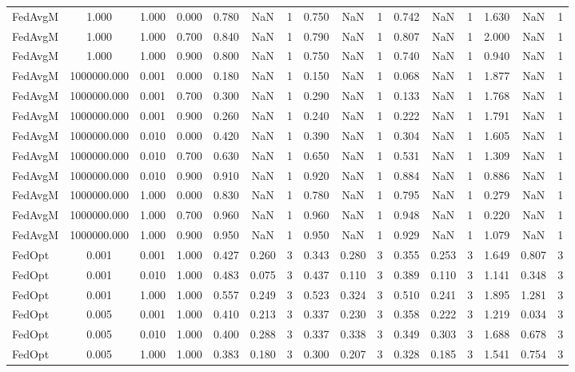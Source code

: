 \begin{table}[htbp]
\begin{tabular}{lccccccccccccccc}
FedAvgM & 1.000 & 1.000 & 0.000 & 0.780 & NaN & 1 & 0.750 & NaN & 1 & 0.742 & NaN & 1 & 1.630 & NaN & 1 \\
FedAvgM & 1.000 & 1.000 & 0.700 & 0.840 & NaN & 1 & 0.790 & NaN & 1 & 0.807 & NaN & 1 & 2.000 & NaN & 1 \\
FedAvgM & 1.000 & 1.000 & 0.900 & 0.800 & NaN & 1 & 0.750 & NaN & 1 & 0.740 & NaN & 1 & 0.940 & NaN & 1 \\
FedAvgM & 1000000.000 & 0.001 & 0.000 & 0.180 & NaN & 1 & 0.150 & NaN & 1 & 0.068 & NaN & 1 & 1.877 & NaN & 1 \\
FedAvgM & 1000000.000 & 0.001 & 0.700 & 0.300 & NaN & 1 & 0.290 & NaN & 1 & 0.133 & NaN & 1 & 1.768 & NaN & 1 \\
FedAvgM & 1000000.000 & 0.001 & 0.900 & 0.260 & NaN & 1 & 0.240 & NaN & 1 & 0.222 & NaN & 1 & 1.791 & NaN & 1 \\
FedAvgM & 1000000.000 & 0.010 & 0.000 & 0.420 & NaN & 1 & 0.390 & NaN & 1 & 0.304 & NaN & 1 & 1.605 & NaN & 1 \\
FedAvgM & 1000000.000 & 0.010 & 0.700 & 0.630 & NaN & 1 & 0.650 & NaN & 1 & 0.531 & NaN & 1 & 1.309 & NaN & 1 \\
FedAvgM & 1000000.000 & 0.010 & 0.900 & 0.910 & NaN & 1 & 0.920 & NaN & 1 & 0.884 & NaN & 1 & 0.886 & NaN & 1 \\
FedAvgM & 1000000.000 & 1.000 & 0.000 & 0.830 & NaN & 1 & 0.780 & NaN & 1 & 0.795 & NaN & 1 & 0.279 & NaN & 1 \\
FedAvgM & 1000000.000 & 1.000 & 0.700 & 0.960 & NaN & 1 & 0.960 & NaN & 1 & 0.948 & NaN & 1 & 0.220 & NaN & 1 \\
FedAvgM & 1000000.000 & 1.000 & 0.900 & 0.950 & NaN & 1 & 0.950 & NaN & 1 & 0.929 & NaN & 1 & 1.079 & NaN & 1 \\
FedOpt & 0.001 & 0.001 & 1.000 & 0.427 & 0.260 & 3 & 0.343 & 0.280 & 3 & 0.355 & 0.253 & 3 & 1.649 & 0.807 & 3 \\
FedOpt & 0.001 & 0.010 & 1.000 & 0.483 & 0.075 & 3 & 0.437 & 0.110 & 3 & 0.389 & 0.110 & 3 & 1.141 & 0.348 & 3 \\
FedOpt & 0.001 & 1.000 & 1.000 & 0.557 & 0.249 & 3 & 0.523 & 0.324 & 3 & 0.510 & 0.241 & 3 & 1.895 & 1.281 & 3 \\
FedOpt & 0.005 & 0.001 & 1.000 & 0.410 & 0.213 & 3 & 0.337 & 0.230 & 3 & 0.358 & 0.222 & 3 & 1.219 & 0.034 & 3 \\
FedOpt & 0.005 & 0.010 & 1.000 & 0.400 & 0.288 & 3 & 0.337 & 0.338 & 3 & 0.349 & 0.303 & 3 & 1.688 & 0.678 & 3 \\
FedOpt & 0.005 & 1.000 & 1.000 & 0.383 & 0.180 & 3 & 0.300 & 0.207 & 3 & 0.328 & 0.185 & 3 & 1.541 & 0.754 & 3 \\

\end{tabular}
\end{table}
